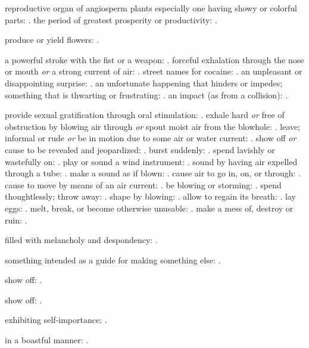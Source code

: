   reproductive organ of angiosperm plants especially one having showy or colorful parts: . the period of greatest prosperity or productivity: .

  produce or yield flowers: .

  a powerful stroke with the fist or a weapon: . forceful exhalation through the nose or mouth \textit{or} a strong current of air: . street names for cocaine: . an unpleasant or disappointing surprise: . an unfortunate happening that hinders or impedes; something that is thwarting or frustrating: . an impact (as from a collision): .

  provide sexual gratification through oral stimulation: . exhale hard \textit{or} free of obstruction by blowing air through \textit{or} spout moist air from the blowhole: . leave; informal or rude \textit{or} be in motion due to some air or water current: . show off \textit{or} cause to be revealed and jeopardized: . burst suddenly: . spend lavishly or wastefully on: . play or sound a wind instrument: . sound by having air expelled through a tube: . make a sound as if blown: . cause air to go in, on, or through: . cause to move by means of an air current: . be blowing or storming: . spend thoughtlessly; throw away: . shape by blowing: . allow to regain its breath: . lay eggs: . melt, break, or become otherwise unusable: . make a mess of, destroy or ruin: .

  filled with melancholy and despondency: .

  something intended as a guide for making something else: .

  show off: .

  show off: .

  exhibiting self-importance: .

  in a boastful manner: .

